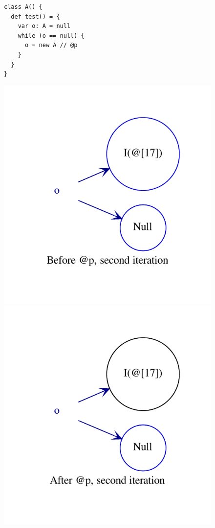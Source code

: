 \begin{figure}[h]
\begin{minipage}[tl]{0.4\linewidth}
    \centering
\lstset{linewidth=0.6\linewidth}
\begin{lstlisting}
class A() {
  def test() = {
    var o: A = null
    while (o == null) {
      o = new A // @p
    }
  }
}
\end{lstlisting}
\end{minipage}
\begin{minipage}[tr]{0.7\linewidth}
    \centering
    \includegraphics[scale=0.5]{images/pt_alloccycle1}
    \includegraphics[scale=0.5]{images/pt_alloccycle2}

\end{minipage}
\end{figure}
